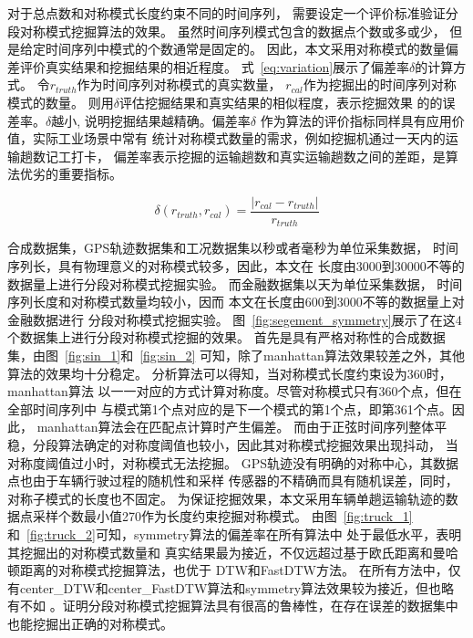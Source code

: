 对于总点数和对称模式长度约束不同的时间序列，
需要设定一个评价标准验证分段对称模式挖掘算法的效果。
虽然时间序列模式包含的数据点个数或多或少，
但是给定时间序列中模式的个数通常是固定的。
因此，本文采用对称模式的数量偏差评价真实结果和挖掘结果的相近程度。
式~\ref{eq:variation}展示了偏差率$\delta$的计算方式。
令$r_{truth}$作为时间序列对称模式的真实数量，
$r_{cal}$作为挖掘出的时间序列对称模式的数量。
则用$\delta$评估挖掘结果和真实结果的相似程度，表示挖掘效果
的的误差率。$\delta$越小, 说明挖掘结果越精确。偏差率$\delta$
作为算法的评价指标同样具有应用价值，实际工业场景中常有
统计对称模式数量的需求，例如挖掘机通过一天内的运输趟数记工打卡，
偏差率表示挖掘的运输趟数和真实运输趟数之间的差距，是算法优劣的重要指标。

\begin{equation}
  \delta \left( r_{truth}, r_{cal} \right) = \frac{\left| r_{cal} - r_{truth} \right|}{r_{truth}}
  \label{eq:variation}
\end{equation}

合成数据集，GPS轨迹数据集和工况数据集以秒或者毫秒为单位采集数据，
时间序列长，具有物理意义的对称模式较多，因此，本文在
长度由3000到30000不等的数据量上进行分段对称模式挖掘实验。
而金融数据集以天为单位采集数据，
时间序列长度和对称模式数量均较小，因而
本文在长度由600到3000不等的数据量上对金融数据进行
分段对称模式挖掘实验。
图~\ref{fig:segement_symmetry}展示了在这4个数据集上进行分段对称模式挖掘的效果。
首先是具有严格对称性的合成数据集，由图~\ref{fig:sin_1}和~\ref{fig:sin_2}
可知，除了manhattan算法效果较差之外，其他算法的效果均十分稳定。
分析算法可以得知，当对称模式长度约束设为360时，manhattan算法
以一一对应的方式计算对称度。尽管对称模式只有360个点，但在全部时间序列中
与模式第1个点对应的是下一个模式的第1个点，即第361个点。因此，
manhattan算法会在匹配点计算时产生偏差。
而由于正弦时间序列整体平稳，分段算法确定的对称度阈值也较小，因此其对称模式挖掘效果出现抖动，
当对称度阈值过小时，对称模式无法挖掘。
GPS轨迹没有明确的对称中心，其数据点也由于车辆行驶过程的随机性和采样
传感器的不精确而具有随机误差，同时，对称子模式的长度也不固定。
为保证挖掘效果，本文采用车辆单趟运输轨迹的数据点采样个数最小值270作为长度约束挖掘对称模式。
由图~\ref{fig:truck_1}和~\ref{fig:truck_2}可知，symmetry算法的偏差率在所有算法中
处于最低水平，表明其挖掘出的对称模式数量和
真实结果最为接近，不仅远超过基于欧氏距离和曼哈顿距离的对称模式挖掘算法，也优于
DTW和FastDTW方法。
在所有方法中，仅有center\_DTW和center\_FastDTW算法和symmetry算法效果较为接近，但也略有不如
。证明分段对称模式挖掘算法具有很高的鲁棒性，在存在误差的数据集中
也能挖掘出正确的对称模式。

